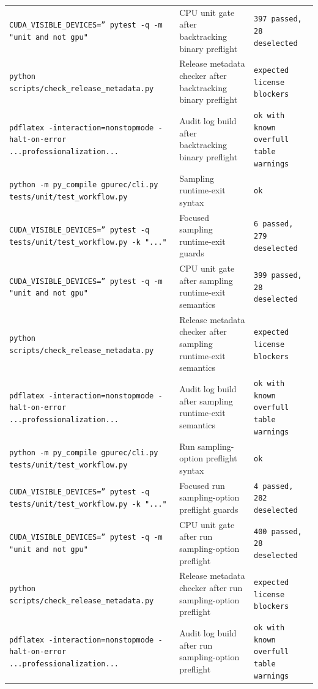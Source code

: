 \documentclass[11pt]{article}
\begin{document}
\begin{center}
\begin{tabular}{lll}
\texttt{CUDA\_VISIBLE\_DEVICES='' pytest -q -m "unit and not gpu"} &
CPU unit gate after backtracking binary preflight &
\texttt{397 passed, 28 deselected} \\
\texttt{python scripts/check\_release\_metadata.py} &
Release metadata checker after backtracking binary preflight &
\texttt{expected license blockers} \\
\texttt{pdflatex -interaction=nonstopmode -halt-on-error ...professionalization...} &
Audit log build after backtracking binary preflight &
\texttt{ok with known overfull table warnings} \\
\texttt{python -m py\_compile gpurec/cli.py tests/unit/test\_workflow.py} &
Sampling runtime-exit syntax &
\texttt{ok} \\
\texttt{CUDA\_VISIBLE\_DEVICES='' pytest -q tests/unit/test\_workflow.py -k "..."} &
Focused sampling runtime-exit guards &
\texttt{6 passed, 279 deselected} \\
\texttt{CUDA\_VISIBLE\_DEVICES='' pytest -q -m "unit and not gpu"} &
CPU unit gate after sampling runtime-exit semantics &
\texttt{399 passed, 28 deselected} \\
\texttt{python scripts/check\_release\_metadata.py} &
Release metadata checker after sampling runtime-exit semantics &
\texttt{expected license blockers} \\
\texttt{pdflatex -interaction=nonstopmode -halt-on-error ...professionalization...} &
Audit log build after sampling runtime-exit semantics &
\texttt{ok with known overfull table warnings} \\
\texttt{python -m py\_compile gpurec/cli.py tests/unit/test\_workflow.py} &
Run sampling-option preflight syntax &
\texttt{ok} \\
\texttt{CUDA\_VISIBLE\_DEVICES='' pytest -q tests/unit/test\_workflow.py -k "..."} &
Focused run sampling-option preflight guards &
\texttt{4 passed, 282 deselected} \\
\texttt{CUDA\_VISIBLE\_DEVICES='' pytest -q -m "unit and not gpu"} &
CPU unit gate after run sampling-option preflight &
\texttt{400 passed, 28 deselected} \\
\texttt{python scripts/check\_release\_metadata.py} &
Release metadata checker after run sampling-option preflight &
\texttt{expected license blockers} \\
\texttt{pdflatex -interaction=nonstopmode -halt-on-error ...professionalization...} &
Audit log build after run sampling-option preflight &
\texttt{ok with known overfull table warnings} \\

\end{tabular}
\end{center}
\end{document}
